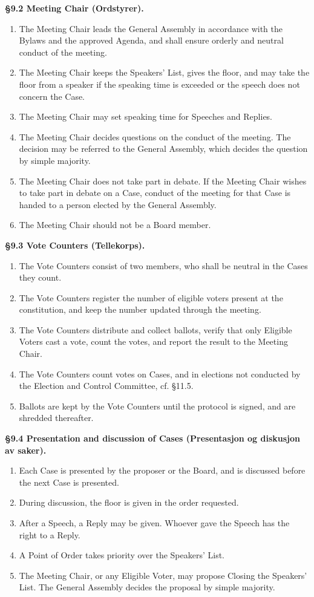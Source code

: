 \documentclass{../../../Common/Latex/Templates/rapport}
\begin{document}
\textbf{\S 9.2 Meeting Chair (Ordstyrer).}
\begin{enumerate}
  \item The Meeting Chair leads the General Assembly in accordance with the Bylaws and the approved Agenda, and shall ensure orderly and neutral conduct of the meeting.
  \item The Meeting Chair keeps the Speakers' List, gives the floor, and may take the floor from a speaker if the speaking time is exceeded or the speech does not concern the Case.
  \item The Meeting Chair may set speaking time for Speeches and Replies.
  \item The Meeting Chair decides questions on the conduct of the meeting. The decision may be referred to the General Assembly, which decides the question by simple majority.
  \item The Meeting Chair does not take part in debate. If the Meeting Chair wishes to take part in debate on a Case, conduct of the meeting for that Case is handed to a person elected by the General Assembly.
  \item The Meeting Chair should not be a Board member.
\end{enumerate}

\textbf{\S 9.3 Vote Counters (Tellekorps).}
\begin{enumerate}
  \item The Vote Counters consist of two members, who shall be neutral in the Cases they count.
  \item The Vote Counters register the number of eligible voters present at the constitution, and keep the number updated through the meeting.
  \item The Vote Counters distribute and collect ballots, verify that only Eligible Voters cast a vote, count the votes, and report the result to the Meeting Chair.
  \item The Vote Counters count votes on Cases, and in elections not conducted by the Election and Control Committee, cf. \S11.5.
  \item Ballots are kept by the Vote Counters until the protocol is signed, and are shredded thereafter.
\end{enumerate}

\textbf{\S 9.4 Presentation and discussion of Cases (Presentasjon og diskusjon av saker).}
\begin{enumerate}
  \item Each Case is presented by the proposer or the Board, and is discussed before the next Case is presented.
  \item During discussion, the floor is given in the order requested.
  \item After a Speech, a Reply may be given. Whoever gave the Speech has the right to a Reply.
  \item A Point of Order takes priority over the Speakers' List.
  \item The Meeting Chair, or any Eligible Voter, may propose Closing the Speakers' List. The General Assembly decides the proposal by simple majority.
\end{enumerate}
\end{document}
